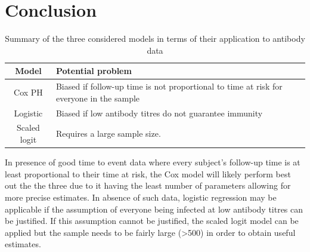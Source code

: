 \documentclass[12pt]{article}
\begin{document}
\pagebreak
%
\section{Conclusion}

\begin{table}[htp]
\centering
\caption{Summary of the three considered models in terms of their application to antibody data}
\begin{tabular}{cp{25em}}
\toprule
Model & Potential problem \\
\midrule
Cox PH & Biased if follow-up time is not proportional to time at risk for everyone in the sample \\
Logistic & Biased if low antibody titres do not guarantee immunity \\
Scaled logit & Requires a large sample size. \\
\bottomrule
\end{tabular}
\end{table}

In presence of good time to event data where every subject's follow-up time is at least proportional to their time at risk, the Cox model will likely perform best out the the three due to it having the least number of parameters allowing for more precise estimates. In absence of such data, logistic regression may be applicable if the assumption of everyone being infected at low antibody titres can be justified. If this assumption cannot be justified, the scaled logit model can be applied but the sample needs to be fairly large (>500) in order to obtain useful estimates.
\end{document}
